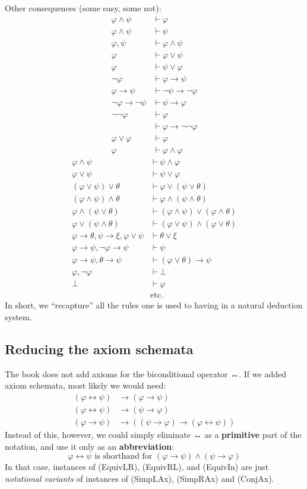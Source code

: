 \documentclass[12pt]{report}
\theoremstyle{nonumberplain}
\newcommand{\defm}[1]{\textbf{#1}\index{#1}}
\begin{document}
\medskip\noindent Other consequences (some easy, some not):
\begin{align*}
φ ∧ ψ &⊢ φ \tag{Simp}\\
φ ∧ ψ &⊢ ψ \tag{Simp}\\
φ, ψ &⊢ φ ∧ ψ \tag{Conj}\\
φ &⊢ φ ∨ ψ \tag{Add}\\
φ &⊢ ψ ∨ φ \tag{Add}\\
¬φ &⊢ φ → ψ \tag{FA}\\
φ → ψ &⊢ ¬ψ → ¬φ \tag{Trans}\\
¬φ → ¬ψ &⊢ ψ → φ \tag{Trans}\\
¬¬φ &⊢ φ \tag{DNE}\\
&⊢ φ → ¬¬φ \tag{DNITheo}\\
φ ∨ φ &⊢ φ \tag{Taut}\\
φ &⊢ φ ∧ φ \tag{Taut}
\end{align*}
\vspace*{-2\baselineskip}\begin{align*}
φ ∧ ψ &⊢ ψ ∧ φ \tag{Com}\\
φ ∨ ψ &⊢ ψ ∨ φ \tag{Com}\\
(φ ∨ ψ) ∨ θ &⊢ φ ∨ (ψ ∨ θ) \tag{Assoc}\\
(φ ∧ ψ) ∧ θ &⊢ φ ∧ (ψ ∧ θ) \tag{Assoc}\\
φ ∧ (ψ ∨ θ) &⊢ (φ ∧ ψ) ∨ (φ ∧ θ) \tag{Dist}\\
φ ∨ (ψ ∧ θ) &⊢ (φ ∨ ψ) ∧ (φ ∨ θ) \tag{Dist}\\
φ → θ, ψ → ξ, φ ∨ ψ &⊢ θ ∨ ξ \tag{CD}\\
φ → ψ, ¬φ → ψ &⊢ ψ \tag{Inev}\\
φ → ψ, θ → ψ &⊢ (φ ∨ θ) → ψ \tag{Cases}\\
φ, ¬φ &⊢ ⊥ \tag{Contra}\\
⊥  &⊢ φ \tag{Explode}\\
&\text{etc.}
\end{align*}
In short, we ``recapture'' all the rules one is used to having in a natural deduction system.

\subsection*{Reducing the axiom schemata}

The book does not add axioms for the biconditional operator ↔. If we added axiom schemata, most likely we would need:%
\label{equiv:axs}\begin{align}
(φ ↔ ψ) &→ (φ → ψ) \tag{EquivLR}\\
(φ ↔ ψ) &→ (ψ → φ) \tag{EquivRL}\\
(φ → ψ) &→ ((ψ → φ) → (φ ↔ ψ)) \tag{EquivIn}
\end{align}
Instead of this, however, we could simply eliminate ↔ as a \defm{primitive} part of the notation, and use it only as an \defm{abbreviation}:
\[
φ ↔ ψ\text{ is shorthand for }(φ → ψ) ∧ (ψ → φ)
\]
In that case, instances of (EquivLR), (EquivRL), and (EquivIn) are just \emph{notational variants} of instances of (SimpLAx), (SimpRAx) and (ConjAx).
\end{document}
